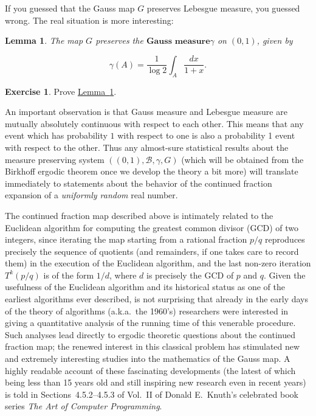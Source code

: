 \documentclass[11pt]{report}
\theoremstyle{plain}
\newtheorem{lem}[thm]{Lemma}
\theoremstyle{definition}
\newtheorem{xexercise}[thm]{Exercise}
\begin{document}
\begin{enumerate}[label=\arabic*.]
If you guessed that the Gauss map $G$ preserves
Lebesgue measure, you guessed wrong. The real
situation is more interesting:

\begin{lem}
\label{lem-gauss-measure}
The map $G$ preserves the $\textbf{Gauss measure}$$\gamma$ on $(0,1)$, given by

\[
\gamma(A) = \frac{1}{\log 2} \int_A \frac{dx}{1+x}.
\]

\end{lem}

\begin{xexercise}
Prove \hyperref[lem-gauss-measure]{Lemma~\ref*{lem-gauss-measure}}.
\end{xexercise}

\noindent An important observation is that Gauss measure and
Lebesgue measure are mutually absolutely continuous
with respect to each other. This means that any event
which has probability $1$ with respect to one is also
a probability 1 event with respect to the other. Thus
any almost-sure statistical results about the measure
preserving system $((0,1),\mathcal{B},\gamma,G)$
(which will be obtained from the Birkhoff ergodic
theorem once we develop the theory a bit more) will
translate immediately to statements about the behavior
of the continued fraction expansion of a \emph{uniformly
random} real number.

The continued fraction map described above is
intimately related to the Euclidean algorithm for
computing the greatest common divisor (GCD) of two
integers, since iterating the map starting from a
rational fraction $p/q$ reproduces precisely the
sequence of quotients (and remainders, if one takes
care to record them) in the execution of the Euclidean
algorithm, and the last non-zero iteration $T^k(p/q)$
is of the form $1/d$, where $d$ is precisely the GCD
of $p$ and $q$. Given the usefulness of the Euclidean
algorithm and its historical status as one of the
earliest algorithms ever described, is not surprising
that already in the early days of the theory of
algorithms (a.k.a.\ the 1960's) researchers were
interested in giving a quantitative analysis of the
running time of this venerable procedure. Such
analyses lead directly to ergodic theoretic questions
about the continued fraction map; the renewed interest
in this classical problem has stimulated new and
extremely interesting studies into the mathematics of
the Gauss map. A highly readable account of these
fascinating developments (the latest of which being
less than 15 years old and still inspiring new
research even in recent years) is told in
Sections~4.5.2--4.5.3 of Vol.~II of Donald E.\ Knuth's
celebrated book series \emph{The Art of Computer
Programming}.


\end{enumerate}
\end{document}
